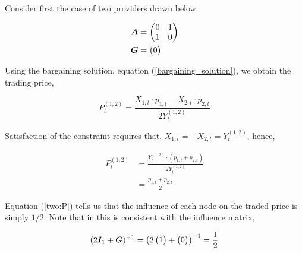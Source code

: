 Consider first the case of two providers drawn below.

\vspace{5mm}
\begin{minipage}{.5\textwidth}
    \resizebox{\textwidth}{!}{}
\end{minipage}
\begin{minipage}{.45\textwidth}
    \begin{equation*}
        \begin{split}
            \bm{A} &= \begin{pmatrix}
                0 & 1 \\
                1 & 0
            \end{pmatrix} \\
            \bm{G} &= \begin{pmatrix}
                0
            \end{pmatrix}
        \end{split}
    \end{equation*}
\end{minipage}
\vspace{5mm}

Using the bargaining solution, equation (\ref{bargaining_solution}), we obtain the trading price,

\begin{equation}
    P^{(1, 2)}_t = \frac{X_{1, t} \cdot p_{1, t} - X_{2, t} \cdot p_{2, t}}{2 Y^{(1, 2)}_t}
\end{equation}

Satisfaction of the constraint requires that, $X_{1, t} = - X_{2, t} = Y^{(1, 2)}_t$, hence,

\begin{equation} \label{two:P}
    \begin{split}
        P^{(1, 2)}_t &= \frac{Y^{(1, 2)}_t \cdot \left( p_{1, t} + p_{2, t} \right)}{2  Y^{(1, 2)}_t} \\
        &= \frac{p_{1, t} + p_{2, t}}{2}
    \end{split}
\end{equation}

Equation (\ref{two:P}) tells us that the influence of each node on the traded price is simply $1 / 2$. Note that in this is consistent with the influence matrix,

\begin{equation}
    (2 \bm{I}_{1} + \bm{G})^{-1} = \left( 2 \begin{pmatrix} 1 \end{pmatrix} + \begin{pmatrix} 0 \end{pmatrix} \right)^{-1} = \frac{1}{2}
\end{equation}

